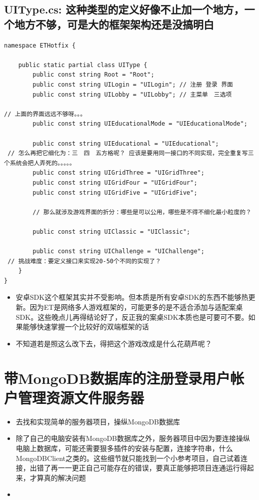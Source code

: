\documentclass[9pt, b5paper]{article}
\begin{document}
\subsection{UIType.cs: 这种类型的定义好像不止加一个地方，一个地方不够，可是大的框架架构还是没搞明白}
\label{sec-4-1}
\begin{verbatim}
namespace ETHotfix {

    public static partial class UIType {
        public const string Root = "Root";
        public const string UILogin = "UILogin"; // 注册 登录 界面
        public const string UILobby = "UILobby"; // 主菜单　三选项

// 上面的界面远远不够呀。。。
        public const string UIEducationalMode = "UIEducationalMode"; 

        public const string UIEducational = "UIEducational"; 
 // 怎么再把它细化为：三　四　五方格呢？ 应该是要用同一接口的不同实现，完全重复写三个系统会把人弄死的。。。。。
        public const string UIGridThree = "UIGridThree";
        public const string UIGridFour = "UIGridFour"; 
        public const string UIGridFive = "UIGridFive"; 

        // 那么就涉及游戏界面的折分：哪些是可以公用，哪些是不得不细化最小粒度的？
        
        public const string UIClassic = "UIClassic"; 

        public const string UIChallenge = "UIChallenge"; 
 // 挑战难度：要定义接口来实现20-50个不同的实现了？        
    }
}
\end{verbatim}

\begin{itemize}
\item 安卓SDK这个框架其实并不受影响。但本质是所有安卓SDK的东西不能够热更新。因为ET是网络多人游戏框架的，可能更多的是不适合添加与适配案桌SDK。这些晚点儿再得结论好了，反正我的案桌SDK本质也是可要可不要。如果能够快速掌握一个比较好的双端框架的话
\item 不知道若是照这么改下去，得把这个游戏改成是什么花葫芦呢？
\end{itemize}
\section{带MongoDB数据库的注册登录用户帐户管理资源文件服务器}
\label{sec-5}
\begin{itemize}
\item 去找和实现简单的服务器项目，操纵MongoDB数据库
\item 除了自己的电脑安装有MongoDB数据库之外，服务器项目中因为要连接操纵电脑上数据库，可能还需要狠多插件的安装与配置，连接字符串，什么MongoDBClient之类的。这些细节就只能找到一个小参考项目，自己试着连接，出错了再一一更正自己可能存在的错误，要真正能够把项目连通运行得起来，才算真的解决问题
\item 
\end{itemize}
\end{document}
